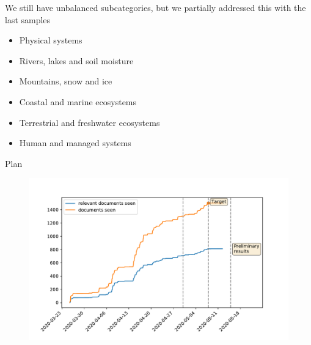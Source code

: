 \documentclass[9pt]{beamer}
\begin{document}
\begin{frame}{We still have unbalanced subcategories, but we partially addressed this with the last samples}

\begin{itemize}
	\item Physical systems \hyperlink{Phy}{}
	\item Rivers, lakes and soil moisture \hyperlink{Riv}{}
	\item Mountains, snow and ice \hyperlink{Moun}{}
	\item Coastal and marine ecosystems \hyperlink{Mar}{}
	\item Terrestrial and freshwater ecosystems \hyperlink{TES}{}
	\item Human and managed systems \hyperlink{Hum}{}
\end{itemize}


\end{frame}

\begin{frame}{Plan}
\begin{figure}
	\includegraphics[width=\linewidth]{../plots/progress/plan.pdf}
\end{figure}
\end{frame}
\end{document}
